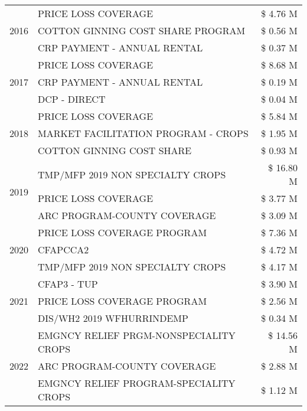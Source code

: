 \begin{tabular}{llr}
\cline{1-3}
\multirow[t]{3}{*}{2016} & PRICE LOSS COVERAGE & \$ 4.76 M \\
 & COTTON GINNING COST SHARE PROGRAM & \$ 0.56 M \\
 & CRP PAYMENT - ANNUAL RENTAL & \$ 0.37 M \\
\cline{1-3}
\multirow[t]{3}{*}{2017} & PRICE LOSS COVERAGE & \$ 8.68 M \\
 & CRP PAYMENT - ANNUAL RENTAL & \$ 0.19 M \\
 & DCP - DIRECT & \$ 0.04 M \\
\cline{1-3}
\multirow[t]{3}{*}{2018} & PRICE LOSS COVERAGE & \$ 5.84 M \\
 & MARKET FACILITATION PROGRAM - CROPS & \$ 1.95 M \\
 & COTTON GINNING COST SHARE & \$ 0.93 M \\
\cline{1-3}
\multirow[t]{3}{*}{2019} & TMP/MFP 2019 NON SPECIALTY CROPS & \$ 16.80 M \\
 & PRICE LOSS COVERAGE & \$ 3.77 M \\
 & ARC PROGRAM-COUNTY COVERAGE & \$ 3.09 M \\
\cline{1-3}
\multirow[t]{3}{*}{2020} & PRICE LOSS COVERAGE PROGRAM & \$ 7.36 M \\
 & CFAPCCA2 & \$ 4.72 M \\
 & TMP/MFP 2019 NON SPECIALTY CROPS & \$ 4.17 M \\
\cline{1-3}
\multirow[t]{3}{*}{2021} & CFAP3 - TUP & \$ 3.90 M \\
 & PRICE LOSS COVERAGE PROGRAM & \$ 2.56 M \\
 & DIS/WH2 2019 WFHURRINDEMP & \$ 0.34 M \\
\cline{1-3}
\multirow[t]{3}{*}{2022} & EMGNCY RELIEF PRGM-NONSPECIALITY CROPS & \$ 14.56 M \\
 & ARC PROGRAM-COUNTY COVERAGE & \$ 2.88 M \\
 & EMGNCY RELIEF PROGRAM-SPECIALITY CROPS & \$ 1.12 M \\
\cline{1-3}
\bottomrule
\end{tabular}
